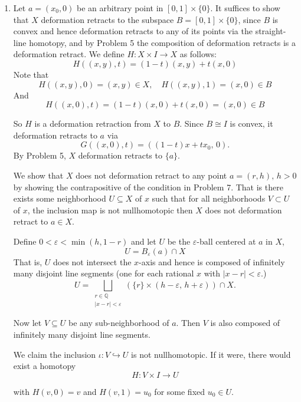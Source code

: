 \documentclass[12pt]{article}
\begin{document}
\begin{solution}
    \bbni
    \begin{enumerate}
        \item [(a)] 
        Let $a = (x_0, 0)$ be an arbitrary point in $[0,1] \times \{0\}$. It suffices to show that $X$ deformation retracts to the subspace $B = [0,1] \times \{0\}$, since $B$ is convex and hence deformation retracts to any of its points via the straight-line homotopy, and by Problem 5 the composition of deformation retracts is a deformation retract. We define $H: X \times I \to X$ as follows: 
        \[H((x,y), t) = (1-t)(x,y)+ t(x,0)\]
        Note that
        \[H((x,y), 0) = (x,y) \in X, \quad H((x,y), 1) = (x,0) \in B\] 
        And  
        \[H((x,0), t) = (1-t)(x,0)+ t(x,0)  = (x,0) \in B\]
       
        So $H$ is a deformation retraction from $X$ to $B$. Since $B \cong I$
        is convex, it deformation retracts to $a$ via
        \[
            G((x,0), t) = ((1-t)x + tx_0,\, 0).
        \]
        By Problem 5, $X$ deformation retracts to $\{a\}$. 


        We show that $X$ does not deformation retract to any point $a = (r, h), \, h > 0$ by showing the contrapositive of the condition in Problem 7. That is there exists some neighborhood $U \subseteq X$ of $x$ such that for all neighborhoods $V \subset U$ of $x$, the inclusion map is not nullhomotopic then $X$ does not deformation retract to $a \in X$. 

        Define $0 < \varepsilon < \min(h, 1-r)$ and let $U$ be the $\varepsilon$-ball centered at $a$ in $X$, 
        \[U = B_\varepsilon(a) \cap X\]
        That is, $U$ does not intersect the $x$-axis and hence is composed of infinitely many disjoint line segments (one for each rational $x$ with $|x - r| < \varepsilon$.)
        \[U = \bigsqcup_{\substack{r \in \mathbb{Q} \\ |x - r| < \varepsilon}} \left(\{r\} \times (h - \varepsilon,\, h+ \varepsilon)\right) \cap X.\]

        Now let $V \subseteq U$ be any sub-neighborhood of $a$. Then $V$ is also composed of infinitely many disjoint line segments.
        
        We claim the inclusion $\iota: V \hookrightarrow U$ is not nullhomotopic. If it were, there would exist a homotopy 
        \[H: V \times I \to U\]

         with $H(v, 0) = v$ and $H(v, 1) = u_0$ for some fixed $u_0 \in U$. 
         

\end{enumerate}
\end{solution}
\end{document}
